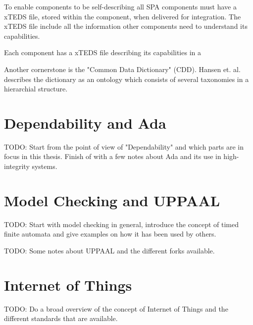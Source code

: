 
To enable components to be self-describing all SPA components must have a xTEDS
file, stored within the component, when delivered for integration. The xTEDS
file include all the information other components need to understand its
capabilities.

Each component has a xTEDS file describing its capabilities in a 

Another cornerstone is the "Common Data Dictionary" (CDD). Hansen et. al.
\cite{hansen2012} describes the dictionary as an ontology which consists of
several taxonomies in a hierarchial structure.


\section{Dependability and Ada}
TODO: Start from the point of view of "Dependability" and which parts are in
focus in this thesis. Finish of with a few notes about Ada and its use in
high-integrity systems.

\section{Model Checking and UPPAAL}
TODO: Start with model checking in general, introduce the concept of timed
finite automata and give examples on how it has been used by others.

TODO: Some notes about UPPAAL and the different forks available.

\section{Internet of Things}
TODO: Do a broad overview of the concept of Internet of Things and the
different standards that are available.
